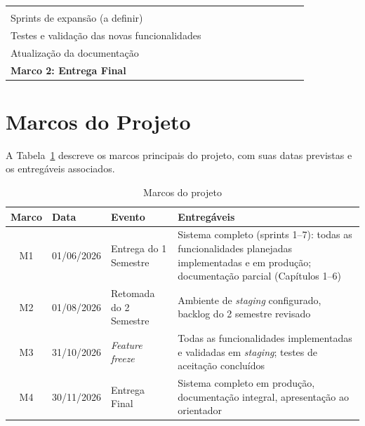 {\begin{table}[H]
{\begin{tabular}{p{6.2cm}cccccccccc}
      & & & & & & \cellcolor{primary!12} & & & & \\
    Sprints de expansão (a definir)
      & & & & & & \cellcolor{primary!12}
      & \cellcolor{primary!12}
      & \cellcolor{primary!12}
      & \cellcolor{primary!12}
      & \\
    Testes e validação das novas funcionalidades
      & & & & & & &
      & \cellcolor{primary!12}
      & \cellcolor{primary!12}
      & \\
    Atualização da documentação
      & & & & & & &
      & \cellcolor{primary!12}
      & \cellcolor{primary!12}
      & \\
    \rowcolor{primary!18}
    \textbf{Marco 2: Entrega Final}
      & & & & & & & & &
      & \cellcolor{primary!70} \\
    \bottomrule
  \end{tabular}}
\end{table}
}

\section{Marcos do Projeto}
\label{sec:milestones}

A Tabela~\ref{tab:milestones} descreve os marcos
principais do projeto, com suas datas previstas
e os entregáveis associados.

\begin{table}[H]
  \centering
  \caption{Marcos do projeto}
  \label{tab:milestones}
  \begin{tabular}{clp{4cm}p{4.5cm}}
    \toprule
    \textbf{Marco} &
    \textbf{Data} &
    \textbf{Evento} &
    \textbf{Entregáveis} \\
    \midrule
    M1 & 01/06/2026
      & Entrega do 1\textordmasculine{} Semestre
      & Sistema completo (sprints 1--7):
        todas as funcionalidades planejadas
        implementadas e em produção;
        documentação parcial (Capítulos 1--6) \\
    \midrule
    M2 & 01/08/2026
      & Retomada do 2\textordmasculine{} Semestre
      & Ambiente de \textit{staging} configurado,
        backlog do 2\textordmasculine{} semestre
        revisado \\
    \midrule
    M3 & 31/10/2026
      & \textit{Feature freeze}
      & Todas as funcionalidades implementadas
        e validadas em \textit{staging}; testes
        de aceitação concluídos \\
    \midrule
    M4 & 30/11/2026
      & Entrega Final
      & Sistema completo em produção,
        documentação integral,
        apresentação ao orientador \\
    \bottomrule
  \end{tabular}
\end{table}
